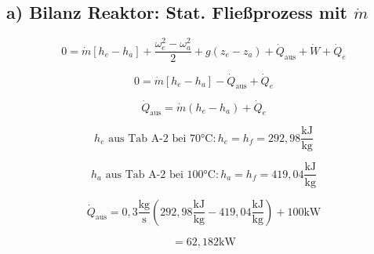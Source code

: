 \subsection*{a) Bilanz Reaktor: Stat. Fließprozess mit $\dot{m}$}

\[
0 = \dot{m} [h_e - h_a] + \frac{\omega_e^2 - \omega_a^2}{2} + g(z_e - z_a) + \dot{Q}_{\text{aus}} + \dot{W} + \dot{Q}_e
\]

\[
0 = \dot{m} [h_e - h_a] - \dot{Q}_{\text{aus}} + \dot{Q}_e
\]

\[
\dot{Q}_{\text{aus}} = \dot{m} (h_e - h_a) + \dot{Q}_e
\]

\[
h_e \text{ aus Tab A-2 bei 70°C}: h_e = h_f = 292{,}98 \frac{\text{kJ}}{\text{kg}}
\]

\[
h_a \text{ aus Tab A-2 bei 100°C}: h_a = h_f = 419{,}04 \frac{\text{kJ}}{\text{kg}}
\]

\[
\dot{Q}_{\text{aus}} = 0{,}3 \frac{\text{kg}}{\text{s}} \left( 292{,}98 \frac{\text{kJ}}{\text{kg}} - 419{,}04 \frac{\text{kJ}}{\text{kg}} \right) + 100 \text{kW}
\]

\[
= 62{,}182 \text{kW}
\]